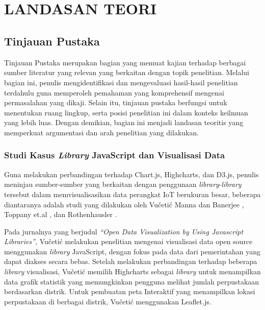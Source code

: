 \chapter[LANDASAN TEORI]{\\ LANDASAN TEORI}

\section{Tinjauan Pustaka}
Tinjauan Pustaka merupakan bagian yang memuat kajian terhadap berbagai sumber literatur yang relevan yang berkaitan dengan topik penelitian. Melalui bagian ini, penulis mengidentifikasi dan mengevaluasi hasil-hasil penelitian terdahulu guna memperoleh pemahaman yang komprehensif mengenai permasalahan yang dikaji. Selain itu, tinjauan pustaka berfungsi untuk menentukan ruang lingkup, serta posisi penelitian ini dalam konteks keilmuan yang lebih luas. Dengan demikian, bagian ini menjadi landasan teoritis yang memperkuat argumentasi dan arah penelitian yang dilakukan.
\subsection{Studi Kasus \textit{Library} JavaScript dan Visualisasi Data}
Guna melakukan perbandingan terhadap Chart.js, Highcharts, dan D3.js, penulis meninjau sumber-sumber yang berkaitan dengan penggunaan \textit{library}-\textit{library} tersebut dalam memvisualisasikan data perangkat IoT berukuran besar, beberapa diantaranya adalah studi yang dilakukan oleh Vučetić \cite{Vueti2023} Manna dan Banerjee \cite{Manna2024}, Toppany et.al \cite{Toppany2023}, dan Rothenhausler \cite{Rothenhausler2022}.

Pada jurnalnya yang berjudul \textit{“Open Data Visualization by Using Javascript Libraries”}, Vučetić \cite{Vueti2023} melakukan penelitian mengenai visualisasi data open source menggunakan \textit{library} JavaScript, dengan fokus pada data dari pemerintahan yang dapat diakses secara bebas. Setelah melakukan perbandingan terhadap beberapa \textit{library} visualisasi, Vučetić memilih Highcharts sebagai \textit{library} untuk menampilkan data grafik statistik yang memungkinkan pengguna melihat jumlah perpustakaan berdasarkan distrik. Untuk pembuatan peta Interaktif yang menampilkan lokasi perpustakaan di berbagai distrik, Vučetić menggunakan Leaflet.js. 

